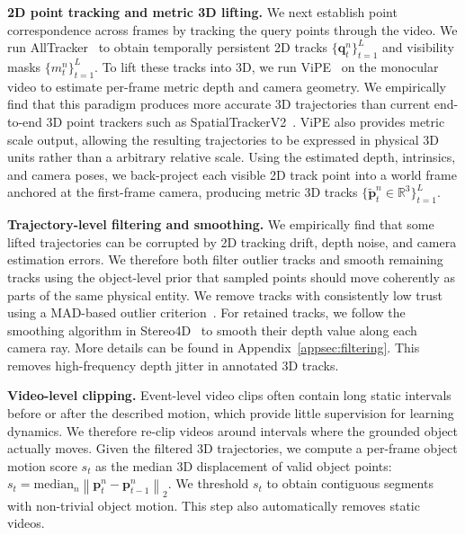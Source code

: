 \noindent\textbf{2D point tracking and metric 3D lifting.}
We next establish point correspondence across frames by tracking the query points through the video. We run AllTracker~\cite{alltracker} to obtain temporally persistent 2D tracks  $\{\mathbf{q}_{t}^{n}\}_{t=1}^{L}$ and visibility masks $\{m_t^{n}\}_{t=1}^{L}$.
To lift these tracks into 3D, we run ViPE~\cite{vipe} on the monocular video to estimate per-frame metric depth and camera geometry. We empirically find that this paradigm produces more accurate 3D trajectories than current end-to-end 3D point trackers such as SpatialTrackerV2~\cite{spatialtrackerv2}. ViPE also provides metric scale output, allowing the resulting trajectories to be expressed in physical 3D units rather than a arbitrary relative scale.  Using the estimated depth, intrinsics, and camera poses, we back-project each visible 2D track point into a world frame anchored at the first-frame camera, producing metric 3D tracks $\{\tilde{\mathbf{p}}_{t}^{n} \in \mathbb{R}^3\}_{t=1}^{L}$.

\noindent\textbf{Trajectory-level filtering and smoothing.}
We empirically find that some lifted trajectories can be corrupted by 2D tracking drift, depth noise, and camera estimation errors. 
We therefore both filter outlier tracks and smooth remaining tracks using the object-level prior that sampled points should move coherently as parts of the same physical entity.
We remove tracks with consistently low trust using a MAD-based outlier criterion~\cite{leys2013madoutlier}.
For retained tracks, we follow the smoothing algorithm in Stereo4D~\cite{stereo4d} to smooth their depth value along each camera ray. More details can be found in Appendix~\ref{appsec:filtering}.
This removes high-frequency depth jitter in annotated 3D tracks.

\noindent\textbf{Video-level clipping.}
Event-level video clips often contain long static intervals before or after the described motion, which provide little supervision for learning dynamics. We therefore re-clip videos around intervals where the grounded object actually moves.
Given the filtered 3D trajectories, we compute a per-frame object motion score $s_t$ as the median 3D displacement of valid object points:
$
s_t
=
\mathrm{median}_{n}
\left\|
\mathbf{p}_{t}^{n}
-
\mathbf{p}_{t-1}^{n}
\right\|_2 .
$
We threshold $s_t$ to obtain contiguous segments with non-trivial object motion. This step also automatically removes static videos.




